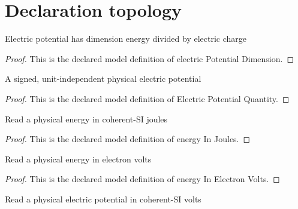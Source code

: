 \section{Declaration topology}
\begin{definition}
  \label{def:physics:phyx-mini-0539:phyxminiproblems-problemphyxmini0539-electricpotentialdimension}
  Electric potential has dimension energy divided by electric charge
\end{definition}
\begin{proof}
  This is the declared model definition of electric Potential Dimension.
\end{proof}
\begin{definition}
  \label{def:physics:phyx-mini-0539:phyxminiproblems-problemphyxmini0539-electricpotentialquantity}
  A signed, unit-independent physical electric potential
\end{definition}
\begin{proof}
  This is the declared model definition of Electric Potential Quantity.
\end{proof}
\begin{definition}
  \label{def:physics:phyx-mini-0539:phyxminiproblems-problemphyxmini0539-energyinjoules}
  Read a physical energy in coherent-SI joules
\end{definition}
\begin{proof}
  This is the declared model definition of energy In Joules.
\end{proof}
\begin{definition}
  \label{def:physics:phyx-mini-0539:phyxminiproblems-problemphyxmini0539-energyinelectronvolts}
  Read a physical energy in electron volts
\end{definition}
\begin{proof}
  This is the declared model definition of energy In Electron Volts.
\end{proof}
\begin{definition}
  \label{def:physics:phyx-mini-0539:phyxminiproblems-problemphyxmini0539-electricpotentialinvolts}
  Read a physical electric potential in coherent-SI volts
\end{definition}
